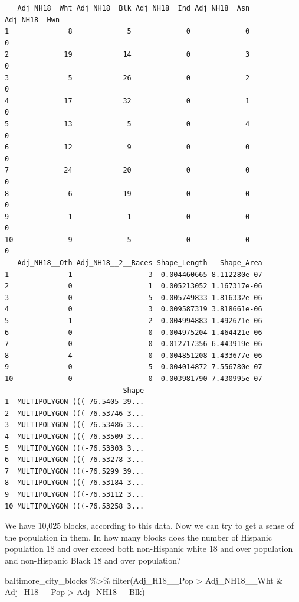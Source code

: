 \documentclass[
  letterpaper,
  DIV=11,
  numbers=noendperiod]{scrreprt}
\newenvironment{Shaded}{\begin{snugshade}}{\end{snugshade}}
\newcommand{\FunctionTok}[1]{\textcolor[rgb]{0.28,0.35,0.67}{#1}}
\newcommand{\NormalTok}[1]{\textcolor[rgb]{0.00,0.23,0.31}{#1}}
\newcommand{\SpecialCharTok}[1]{\textcolor[rgb]{0.37,0.37,0.37}{#1}}
\begin{document}
\begin{verbatim}
   Adj_NH18__Wht Adj_NH18__Blk Adj_NH18__Ind Adj_NH18__Asn Adj_NH18__Hwn
1              8             5             0             0             0
2             19            14             0             3             0
3              5            26             0             2             0
4             17            32             0             1             0
5             13             5             0             4             0
6             12             9             0             0             0
7             24            20             0             0             0
8              6            19             0             0             0
9              1             1             0             0             0
10             9             5             0             0             0
   Adj_NH18__Oth Adj_NH18__2__Races Shape_Length   Shape_Area
1              1                  3  0.004460665 8.112280e-07
2              0                  1  0.005213052 1.167317e-06
3              0                  5  0.005749833 1.816332e-06
4              0                  3  0.009587319 3.818661e-06
5              1                  2  0.004994883 1.492671e-06
6              0                  0  0.004975204 1.464421e-06
7              0                  0  0.012717356 6.443919e-06
8              4                  0  0.004851208 1.433677e-06
9              0                  5  0.004014872 7.556780e-07
10             0                  0  0.003981790 7.430995e-07
                            Shape
1  MULTIPOLYGON (((-76.5405 39...
2  MULTIPOLYGON (((-76.53746 3...
3  MULTIPOLYGON (((-76.53486 3...
4  MULTIPOLYGON (((-76.53509 3...
5  MULTIPOLYGON (((-76.53303 3...
6  MULTIPOLYGON (((-76.53278 3...
7  MULTIPOLYGON (((-76.5299 39...
8  MULTIPOLYGON (((-76.53184 3...
9  MULTIPOLYGON (((-76.53112 3...
10 MULTIPOLYGON (((-76.53258 3...
\end{verbatim}

We have 10,025 blocks, according to this data. Now we can try to get a
sense of the population in them. In how many blocks does the number of
Hispanic population 18 and over exceed both non-Hispanic white 18 and
over population and non-Hispanic Black 18 and over population?

\begin{Shaded}
\begin{Highlighting}[]
\NormalTok{baltimore\_city\_blocks }\SpecialCharTok{\%\textgreater{}\%}
  \FunctionTok{filter}\NormalTok{(Adj\_H18\_\_Pop }\SpecialCharTok{\textgreater{}}\NormalTok{ Adj\_NH18\_\_Wht }\SpecialCharTok{\&}\NormalTok{ Adj\_H18\_\_Pop }\SpecialCharTok{\textgreater{}}\NormalTok{ Adj\_NH18\_\_Blk)}
\end{Highlighting}
\end{Shaded}
\end{document}
